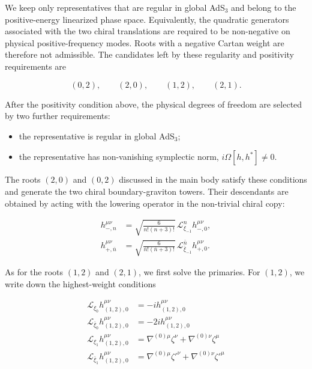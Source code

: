 We keep only representatives that are regular in global AdS\(_3\) and belong to the positive-energy linearized phase space. Equivalently, the quadratic generators associated with the two chiral translations are required to be non-negative on physical positive-frequency modes. Roots with a negative Cartan weight are therefore not admissible. The candidates left by these regularity and positivity requirements are

\[
(0,2),\qquad (2,0),\qquad (1,2),\qquad (2,1).
\]

After the positivity condition above, the physical degrees of freedom are selected by two further requirements:

\begin{itemize}
\tightlist
\item
  the representative is regular in global AdS\(_3\);
\item
  the representative has non-vanishing symplectic norm, \(\displaystyle{i\Omega[h,h^{*}]\neq 0}\).
\end{itemize}

The roots \((2,0)\) and \((0,2)\) discussed in the main body satisfy these conditions and generate the two chiral boundary-graviton towers. Their descendants are obtained by acting with the lowering operator in the non-trivial chiral copy:

\begin{align}
h_{-,n}^{\mu\nu}
&=\sqrt{\frac{6}{n!(n+3)!}}\,
\mathcal{L}_{\xi_{-1}}^n h_{-,0}^{\mu\nu},\\
h_{+,\bar n}^{\mu\nu}
&=\sqrt{\frac{6}{\bar n!(\bar n+3)!}}\,
\mathcal{L}_{\bar\xi_{-1}}^{\bar n}h_{+,0}^{\mu\nu}.
\end{align}

As for the roots \((1,2)\) and \((2,1)\), we first solve the primaries. For \(\displaystyle{(1,2)}\), we write down the highest-weight conditions

\begin{align}
\mathcal{L}_{\xi_{0}}h_{(1,2),0}^{\mu \nu} & =-ih_{(1,2),0}^{\mu \nu} \\
\mathcal{L}_{\bar{\xi}_{0}}h_{(1,2),0}^{\mu \nu} & =-2ih_{(1,2),0}^{\mu \nu} \\
\mathcal{L}_{\xi _{1}}h_{(1,2),0}^{\mu \nu} & =\nabla ^{(0)\mu}\zeta ^{\nu}+\nabla ^{(0)\nu}\zeta ^{\mu} \\
\mathcal{L}_{\bar{\xi}_{1}}h_{(1,2),0}^{\mu \nu} & =\nabla ^{(0)\mu}\zeta'^{\nu}+\nabla ^{(0)\nu}\zeta'^{\mu}
\end{align}

